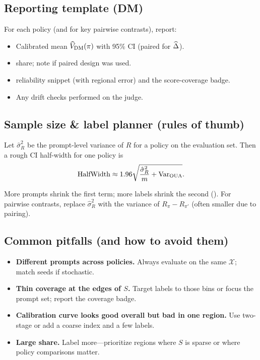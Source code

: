 \subsection{Reporting template (DM)}

For each policy (and for key pairwise contrasts), report:

\begin{itemize}
\item Calibrated mean $\widehat{V}_{\text{DM}}(\pi)$ with 95\% CI (paired for $\widehat{\Delta}$).
\item \oua{} share; note if paired design was used.
\item \autocal{} reliability snippet (with regional error) and the score-coverage badge.
\item Any drift checks performed on the judge.
\end{itemize}

\subsection{Sample size \& label planner (rules of thumb)}

Let $\hat{\sigma}_R^2$ be the prompt-level variance of $R$ for a policy on the evaluation set. Then a rough CI half-width for one policy is
\begin{equation}
\text{HalfWidth} \approx 1.96 \sqrt{\frac{\hat{\sigma}_R^2}{m} + \operatorname{Var}_{\text{OUA}}}.
\end{equation}

More prompts shrink the first term; more labels shrink the second (\oua). For pairwise contrasts, replace $\hat{\sigma}_R^2$ with the variance of $R_\pi - R_{\pi'}$ (often smaller due to pairing).

\subsection{Common pitfalls (and how to avoid them)}

\begin{itemize}
\item \textbf{Different prompts across policies.} Always evaluate on the same $\mathcal{X}$; match seeds if stochastic.

\item \textbf{Thin coverage at the edges of $S$.} Target labels to those bins or focus the prompt set; report the coverage badge.

\item \textbf{Calibration curve looks good overall but bad in one region.} Use two-stage \autocal{} or add a coarse index and a few labels.

\item \textbf{Large \oua{} share.} Label more---prioritize regions where $S$ is sparse or where policy comparisons matter.
\end{itemize}

